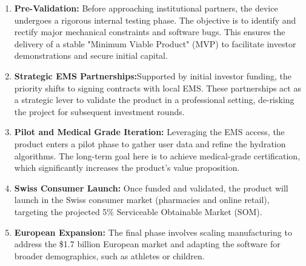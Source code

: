 \documentclass{article}
\begin{document}
\begin{enumerate}
    \item \textbf{Pre-Validation:} Before approaching institutional partners, the device undergoes a rigorous internal testing phase. The objective is to identify and rectify major mechanical constraints and software bugs. This ensures the delivery of a stable "Minimum Viable Product" (MVP) to facilitate investor demonstrations and secure initial capital.
    
    \item \textbf{Strategic EMS Partnerships:}Supported by initial investor funding, the priority shifts to signing contracts with local EMS. These partnerships act as a strategic lever to validate the product in a professional setting, de-risking the project for subsequent investment rounds.
    
    \item \textbf{Pilot and Medical Grade Iteration:} Leveraging the EMS access, the product enters a pilot phase to gather user data and refine the hydration algorithms. The long-term goal here is to achieve medical-grade certification, which significantly increases the product's value proposition.
    
    \item \textbf{Swiss Consumer Launch:} Once funded and validated, the product will launch in the Swiss consumer market (pharmacies and online retail), targeting the projected 5\% Serviceable Obtainable Market (SOM).
    
    \item \textbf{European Expansion:} The final phase involves scaling manufacturing to address the \$1.7 billion European market and adapting the software for broader demographics, such as athletes or children.
\end{enumerate}
\end{document}
